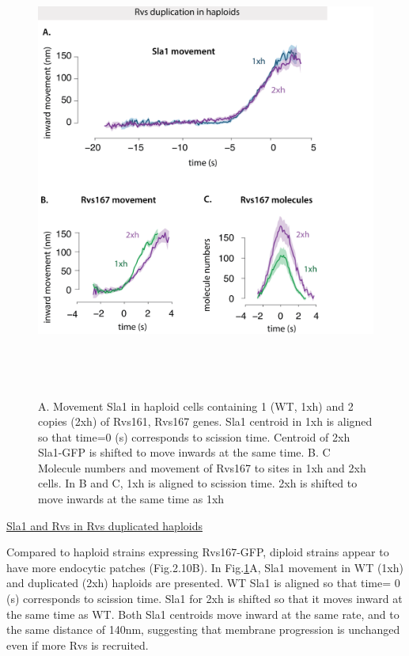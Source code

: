 				\begin{figure}[H]
	\centering
	\includegraphics[width=15cm,height=15cm,keepaspectratio]{figures/results_final/rvs_haploid4}
	\vspace*{2mm}
	\caption[Overexpression of Rvs in haploid cells]
	{A. Movement Sla1 in haploid cells containing 1 (WT, 1xh) and 2 copies (2xh) of Rvs161, Rvs167 genes. Sla1 centroid in 1xh is aligned so that time=0 (s) corresponds to scission time. Centroid of 2xh Sla1-GFP is shifted to move inwards at the same time. 
		B. C Molecule numbers and movement of Rvs167 to sites in 1xh and 2xh cells. In B and C, 1xh is aligned to scission time. 2xh is shifted to move inwards at the same time as 1xh
		\label{fig_rvshaploid}}
	
\end{figure}
 \underline{Sla1 and Rvs in Rvs duplicated haploids}
 
 
 Compared to haploid strains expressing Rvs167-GFP, diploid strains appear to have more endocytic patches (Fig.2.10B). In Fig.\ref{fig_rvshaploid}A, Sla1 movement in WT (1xh) and duplicated (2xh) haploids are presented. WT Sla1 is aligned so that time= 0 (s) corresponds to scission time. Sla1 for 2xh is shifted so that it moves inward at the same time as WT. Both Sla1 centroids move inward at the same rate, and to the same distance of 140nm, suggesting that membrane progression is unchanged even if more Rvs is recruited. 

